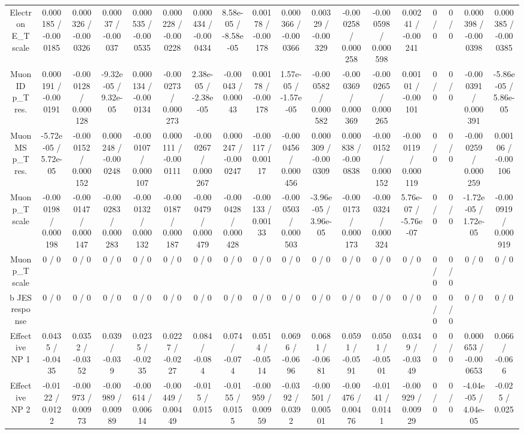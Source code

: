 \documentclass[10pt]{article}
\begin{document}
\begin{table}[htbp]
\begin{center}
\begin{tabular}{|c|c|c|c|c|c|c|c|c|c|c|c|c|c|c|c|c|c|}
  Electron E_{T} scale & 0.000185 / -0.000185 & 0.000326 / -0.000326 & 0.00037 / -0.00037 & 0.000535 / -0.000535 & 0.000228 / -0.000228 & 0.000434 / -0.000434 & 8.58e-05 / -8.58e-05 & 0.00178 / -0.00178 & 0.000366 / -0.000366 & 0.00329 / -0.00329 & -0.000258 / 0.000258 & -0.000598 / 0.000598 & 0.00241 / -0.00241 & 0 / 0 & 0 / 0 & 0.000398 / -0.000398 & 0.000385 / -0.000385 \\ 
  Muon ID p_{T} res. & 0.000191 / -0.000191 & -0.000128 / 0.000128 & -9.32e-05 / 9.32e-05 & 0.000134 / -0.000134 & -0.000273 / 0.000273 & 2.38e-05 / -2.38e-05 & -0.00043 / 0.00043 & 0.00178 / -0.00178 & 1.57e-05 / -1.57e-05 & -0.000582 / 0.000582 & -0.000369 / 0.000369 & -0.000265 / 0.000265 & 0.00101 / -0.00101 & 0 / 0 & 0 / 0 & -0.000391 / 0.000391 & -5.86e-05 / 5.86e-05 \\ 
  Muon MS p_{T} res. & -5.72e-05 / 5.72e-05 & -0.000152 / 0.000152 & 0.000248 / -0.000248 & -0.000107 / 0.000107 & 0.000111 / -0.000111 & -0.000267 / 0.000267 & 0.000247 / -0.000247 & -0.00117 / 0.00117 & -0.000456 / 0.000456 & 0.000309 / -0.000309 & 0.000838 / -0.000838 & -0.000152 / 0.000152 & -0.000119 / 0.000119 & 0 / 0 & 0 / 0 & -0.000259 / 0.000259 & 0.00106 / -0.00106 \\ 
  Muon p_{T} scale & -0.000198 / 0.000198 & -0.000147 / 0.000147 & -0.000283 / 0.000283 & -0.000132 / 0.000132 & -0.000187 / 0.000187 & -0.000479 / 0.000479 & -0.000428 / 0.000428 & -0.00133 / 0.00133 & -0.000503 / 0.000503 & -3.96e-05 / 3.96e-05 & -0.000173 / 0.000173 & -0.000324 / 0.000324 & 5.76e-07 / -5.76e-07 & 0 / 0 & 0 / 0 & -1.72e-05 / 1.72e-05 & -0.000919 / 0.000919 \\ 
  Muon p_{T} scale & 0 / 0 & 0 / 0 & 0 / 0 & 0 / 0 & 0 / 0 & 0 / 0 & 0 / 0 & 0 / 0 & 0 / 0 & 0 / 0 & 0 / 0 & 0 / 0 & 0 / 0 & 0 / 0 & 0 / 0 & 0 / 0 & 0 / 0 \\ 
  b JES response & 0 / 0 & 0 / 0 & 0 / 0 & 0 / 0 & 0 / 0 & 0 / 0 & 0 / 0 & 0 / 0 & 0 / 0 & 0 / 0 & 0 / 0 & 0 / 0 & 0 / 0 & 0 / 0 & 0 / 0 & 0 / 0 & 0 / 0 \\ 
  Effective NP 1 & 0.0435 / -0.0435 & 0.0352 / -0.0352 & 0.039 / -0.039 & 0.0235 / -0.0235 & 0.0227 / -0.0227 & 0.084 / -0.084 & 0.074 / -0.074 & 0.0514 / -0.0514 & 0.0696 / -0.0696 & 0.0681 / -0.0681 & 0.0591 / -0.0591 & 0.0501 / -0.0501 & 0.0349 / -0.0349 & 0 / 0 & 0 / 0 & 0.000653 / -0.000653 & 0.066 / -0.066 \\ 
  Effective NP 2 & -0.0122 / 0.0122 & -0.00973 / 0.00973 & -0.00989 / 0.00989 & -0.00614 / 0.00614 & -0.00449 / 0.00449 & -0.015 / 0.015 & -0.0155 / 0.0155 & -0.00959 / 0.00959 & -0.0392 / 0.0392 & -0.00501 / 0.00501 & -0.00476 / 0.00476 & -0.0141 / 0.0141 & -0.00929 / 0.00929 & 0 / 0 & 0 / 0 & -4.04e-05 / 4.04e-05 & -0.025 / 0.025 \\ 

\end{tabular}
\end{center}
\end{table}
\end{document}

